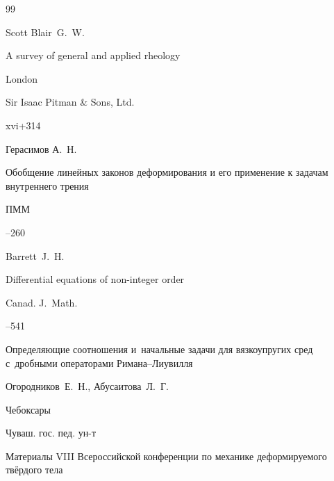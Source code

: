 \begin{thebibliography}{99}

\by Scott Blair~G.~W.

\book A survey of general and applied rheology

\publaddr London

\publ Sir Isaac Pitman \& Sons, Ltd.

\totalpages xvi+314 








\by Герасимов А.~Н.

\paper Обобщение линейных законов деформирования и его применение к задачам внутреннего трения

\jour  ПММ




--260







\by Barrett~J.~H.

\paper Differential equations of non-integer order 

\jour  Canad. J.~Math.



--541






\paper Определяющие соотношения и~начальные задачи для вязкоупругих сред с~дробными операторами Римана--Лиувилля

\by Огородников~Е.~Н., Абусаитова~Л.~Г.

\publaddr Чебоксары

\publ Чуваш. гос. пед. ун-т

\inbook Материалы VIII Всероссийской конференции по механике деформируемого твёрдого тела



\end{thebibliography}
